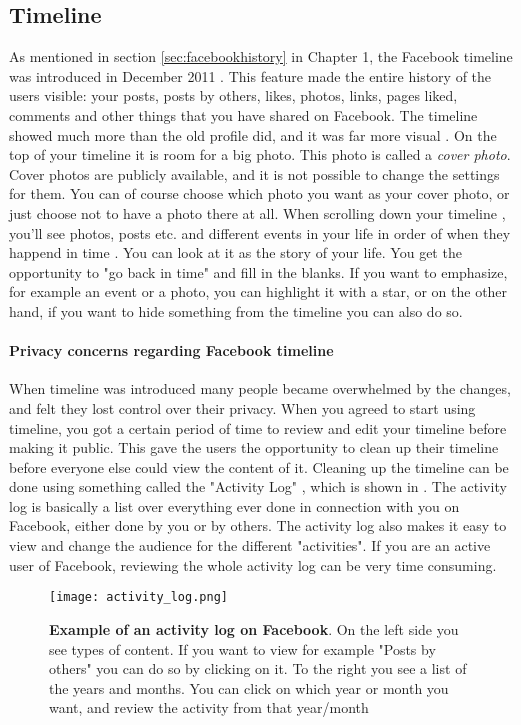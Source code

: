 \subsection{Timeline}
As mentioned in section \ref{sec:facebookhistory} in Chapter 1, the Facebook timeline was introduced in December 2011 \cite{EvolutionOfFacebook}. This feature made the entire history of the users visible: your posts, posts by others, likes, photos, links, pages liked, comments and other things that you have shared on Facebook. The timeline showed much more than the old profile did, and it was far more visual \cite{timeline}. On the top of your timeline it is room for a big photo. This photo is called a \emph{cover photo}. Cover photos are publicly available, and it is not possible to change the settings for them. You can of course choose which photo you want as your cover photo, or just choose not to have a photo there at all. When scrolling down your timeline , you'll see photos, posts etc. and different events in your life in order of when they happend in time \cite{timeline}. You can look at it as the story of your life. You get the opportunity to "go back in time" and fill in the blanks. If you want to emphasize, for example an event or a photo, you can highlight it with a star, or on the other hand, if you want to hide something from the timeline you can also do so. 

\paragraph{Privacy concerns regarding Facebook timeline}
When timeline was introduced many people became overwhelmed by the changes, and felt they lost control over their privacy. When you agreed to start using timeline, you got a certain period of time to review and edit your timeline before making it public. This gave the users the opportunity to clean up their timeline before everyone else could view the content of it. Cleaning up the timeline can be done using something called the "Activity Log" \cite{activitylog}, which is shown in . The activity log is basically a list over everything ever done in connection with you on Facebook, either done by you or by others. The activity log also makes it easy to view and change the audience for the different "activities". If you are an active user of Facebook, reviewing the whole activity log can be very time consuming. 

\begin{figure}[h!]
\centering
\texttt{[image: activity\_log.png]}
\caption [Example of an activity log on Facebook.]{\textbf{Example of an activity log on Facebook}. On the left side you see types of content. If you want to view for example "Posts by others" you can do so by clicking on it. To the right you see a list of the years and months. You can click on which year or month you want, and review the activity from that year/month \cite{activitylog}} 
\label{fig:activitylog}
\end{figure}

